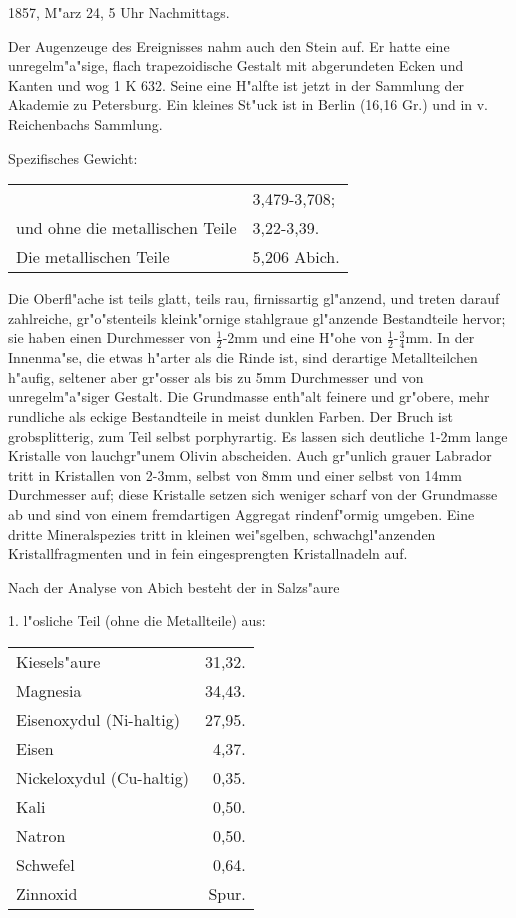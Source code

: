 \documentclass[a4paper, 11pt, oneside]{article}
\begin{document}
1857, M"arz 24, 5 Uhr Nachmittags.

Der Augenzeuge des Ereignisses nahm auch den Stein auf. Er hatte eine unregelm"a"sige, flach trapezoidische Gestalt mit abgerundeten Ecken und Kanten und wog 1 K 632. Seine eine H"alfte ist jetzt in der Sammlung der Akademie zu Petersburg. Ein kleines St"uck ist in Berlin (16,16 Gr.) und in v. Reichenbachs Sammlung.

Spezifisches Gewicht:
\begin{table}[!ht]
    \centering\swabfamily\Large
    \begin{tabular}{l l}
         & 3,479-3,708; \\
        und ohne die metallischen Teile & 3,22-3,39.\\
        Die metallischen Teile & 5,206 Abich.
    \end{tabular}
\end{table}

Die Oberfl"ache ist teils glatt, teils rau, firnissartig gl"anzend, und treten darauf zahlreiche, gr"o"stenteils kleink"ornige stahlgraue gl"anzende Bestandteile hervor; sie haben einen Durchmesser von $\mathfrak{\frac{1}{2}}$-2mm und eine H"ohe von $\mathfrak{\frac{1}{2}}$-$\mathfrak{\frac{3}{4}}$mm. In der Innenma"se, die etwas h"arter als die Rinde ist, sind derartige Metallteilchen h"aufig, seltener aber gr"osser als bis zu 5mm Durchmesser und von unregelm"a"siger Gestalt. Die Grundmasse enth"alt feinere und gr"obere, mehr rundliche als eckige Bestandteile in meist dunklen Farben. Der Bruch ist grobsplitterig, zum Teil selbst porphyrartig. Es lassen sich deutliche 1-2mm lange Kristalle von lauchgr"unem Olivin abscheiden. Auch gr"unlich grauer Labrador tritt in Kristallen von 2-3mm, selbst von 8mm und einer selbst von 14mm Durchmesser auf; diese Kristalle setzen sich weniger scharf von der Grundmasse ab und sind von einem fremdartigen Aggregat rindenf"ormig umgeben. Eine dritte Mineralspezies tritt in kleinen wei"sgelben, schwachgl"anzenden Kristallfragmenten und in fein eingesprengten Kristallnadeln auf.

Nach der Analyse von Abich besteht der in Salzs"aure
\begin{center}
1. l"osliche Teil (ohne die Metallteile) aus:
\end{center}

\begin{table}[H]
    \centering\swabfamily\Large
    \begin{tabular}{l r}
    \hline
        Kiesels"aure & 31,32. \\
        Magnesia & 34,43. \\
        Eisenoxydul (Ni-haltig) & 27,95. \\
        Eisen & 4,37. \\
        Nickeloxydul (Cu-haltig) & 0,35. \\
        Kali & 0,50. \\
        Natron & 0,50. \\
        Schwefel & 0,64. \\
        Zinnoxid & Spur. \\
    \end{tabular}
\end{table}
\end{document}
